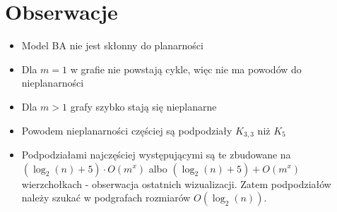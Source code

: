 \documentclass{article}
\begin{document}
\section{Obserwacje}
\begin{itemize}
  \item Model BA nie jest skłonny do planarności
  \item Dla $m=1$ w grafie nie powstają cykle, więc nie ma powodów do nieplanarności
  \item Dla $m>1$ grafy szybko stają się nieplanarne
  \item Powodem nieplanarności częściej są podpodziały $K_{3,3}$ niż $K_5$
  \item Podpodziałami najczęściej występującymi są te zbudowane na $(\log_2(n) + 5) \cdot O(m^x)$ albo $(\log_2(n) + 5) + O(m^x)$  wierzchołkach - obserwacja ostatnich wizualizacji. Zatem podpodziałów należy szukać w podgrafach rozmiarów $O(\log_2(n))$.
\end{itemize}
\end{document}
